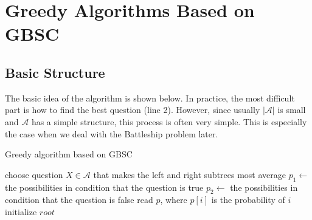 
\section{Greedy Algorithms Based on GBSC}

\subsection{Basic Structure}

The basic idea of the algorithm is shown below. In practice, the most difficult part is how to find the best question (line 2). However, since usually $|\mathscr{A}|$ is small and $\mathscr{A}$ has a simple structure, this process is often very simple. This is especially the case when we deal with the Battleship problem later.

	

\begin{algorithm}[H]
	\caption{Greedy algorithm based on GBSC} 
	\begin{algorithmic}[1]
	    \State choose question $X \in \mathscr{A}$ that makes the left and right subtrees most average
	    \State $p_1 \gets$ the possibilities in condition that the question is true
	    \State {}
	    \State $p_2 \gets$ the possibilities in condition that the question is false
	    \State {}
    \EndProcedure
	\State read $p$, where $p[i]$ is the probability of $i$
	\State initialize $root$
	\State {}
	\end{algorithmic} 
	
\end{algorithm}





